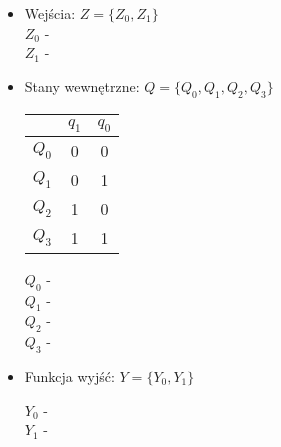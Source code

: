 \documentclass[12pt,a4paper]{article}
\begin{document}
		\begin{itemize}
			\item Wejścia: \(Z = \{Z_0, Z_1\}\)\\
				
				\(Z_0\) - \\
				\(Z_1\) - 
				
			\item Stany wewnętrzne: \(Q =\{Q_0, Q_1, Q_2, Q_3\}\)
				
				\begin{minipage}{{.5\textwidth}}
					\centering
					\begin{tabular}{r|cc}
						&	\(q_1\)	&	\(q_0\)\\\hline
						\(Q_0\)	&	0	&	0	\\
						\(Q_1\)	&	0	&	1	\\
						\(Q_2\)	&	1	&	0	\\
						\(Q_3\)	&	1	&	1	\\
					\end{tabular}
				\end{minipage}%
				\begin{minipage}{{.5\textwidth}}	
					\(Q_0\) - \\
					\(Q_1\) - \\
					\(Q_2\) - \\
					\(Q_3\) - \\
				\end{minipage}
				
			\item Funkcja wyjść: \(Y=\{Y_0, Y_1\}\)
				
				\(Y_0\) - \\
				\(Y_1\) - 
		\end{itemize}
		
\end{document}
